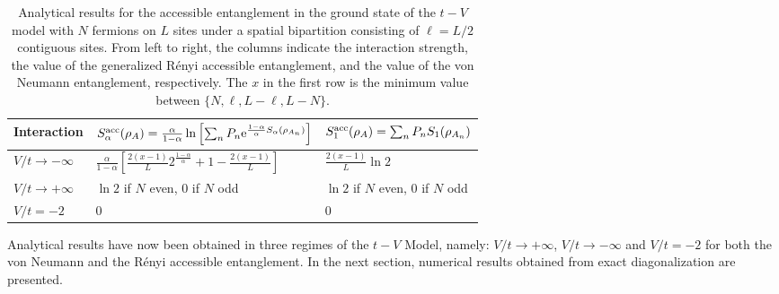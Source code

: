 %
\begin{table}[h!tp]
\begin{center}
   \renewcommand{\arraystretch}{1.8}
   \setlength\tabcolsep{8pt}
 \begin{tabular}{@{}lll@{}} 
  \toprule
    Interaction	& $S_{\alpha}^{\rm acc}(\rho_A) = \frac{\alpha}{1-\alpha}\ln\left[ \sum_{n} P_n \mathrm{e}^{\frac{1-\alpha}{\alpha} S_{\alpha}(\rho_{A_n})}\right]$ & $S_1^{\rm acc}(\rho_A) = \sum_{n} P_n S_{1}(\rho_{A_n})$ \\ 
   \midrule
   $V/t \to -\infty$ & $ \frac{\alpha}{1-\alpha} \left[ \frac{2(x-1)}{L} 2^{\frac{1-\alpha}{\alpha}} + 1 - \frac{2(x-1)}{L} \right]$ & $\frac{2(x-1)}{L} \ln{2}$ \\
   $V/t \to +\infty$ & $\ln{2}$ if $N$ even, $0$ if $N$ odd &  $\ln{2}$ if $N$ even, $0$ if $N$ odd \\
   $V/t = -2$ & $0$ & $0$\\
    \bottomrule
    \end{tabular}
\end{center}
\caption{\label{tab:Limits} 
Analytical results for the accessible entanglement in the ground state of the $t-V$ model with $N$ fermions on $L$ sites under a spatial bipartition consisting of $\ell=L/2$ contiguous sites. From left to right, the columns indicate the interaction strength, the value of the generalized R\'enyi accessible entanglement, and the value of the von Neumann entanglement, respectively. The $x$ in the first row is the minimum value between $ \{ N, \ell, L-\ell, L-N \} $.}
\end{table}
%

Analytical results have now been obtained in three regimes of the $t-V$ Model, namely: $V/t \to + \infty$, $V/t \to - \infty$ and $V/t = -2$ for both the von Neumann and the R\'enyi accessible entanglement. In the next section, numerical results obtained from exact diagonalization are presented.

